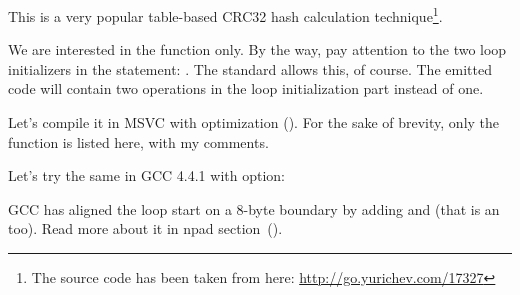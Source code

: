 \label{sec:CRC32}

\newcommand{\URLCRCSRC}{\url{http://go.yurichev.com/17327}}

This is a very popular table-based CRC32 hash calculation 
technique\footnote{The source code has been taken from here: \URLCRCSRC}.




We are interested in the  function only.
By the way, pay attention to the two loop initializers in the  statement: .
The \CCpp standard allows this, of course.
The emitted code will contain two operations in the loop initialization part
instead of one.

Let's compile it in MSVC with optimization (\Ox).
For the sake of brevity, only the  function is listed here, with my comments.



Let's try the same in GCC 4.4.1 with \Othree option:




GCC has aligned the loop start on a 8-byte boundary by adding \NOP and 
(that is an  too).
Read more about it in npad section~().

